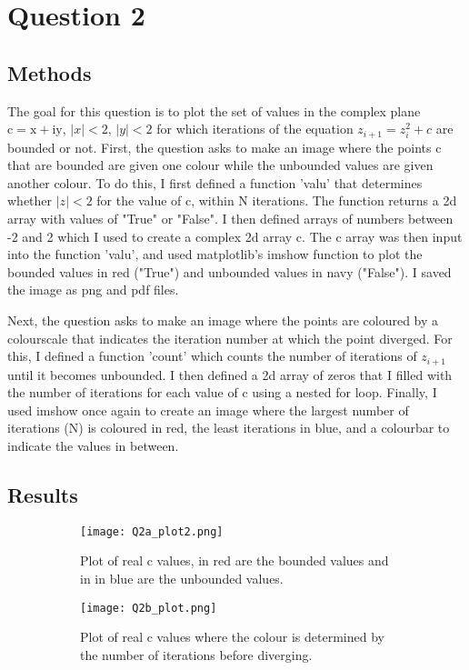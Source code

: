 \documentclass{article}
\begin{document}
\section*{Question 2}
\subsection*{Methods}
The goal for this question is to plot the set of values in the complex plane $\mathrm{c=x+iy},\, |x|<2, \, |y|<2$ for which iterations of the equation $z_{i+1}=z_i^2+c$ are bounded or not. First, the question asks to make an image where the points c that are bounded are given one colour while the unbounded values are given another colour. To do this, I first defined a function 'valu' that determines whether $|z|<2$ for the value of c, within N iterations. The function returns a 2d array with values of "True" or "False". I then defined arrays of numbers between -2 and 2 which I used to create a complex 2d array c. The c array was then input into the function 'valu', and used matplotlib's imshow function to plot the bounded values in red ("True") and unbounded values in navy ("False"). I saved the image as png and pdf files. 

Next, the question asks to make an image where the points are coloured by a colourscale that indicates the iteration number at which the point diverged. For this, I defined a function 'count' which counts the number of iterations of $z_{i+1}$ until it becomes unbounded. I then defined a 2d array of zeros that I filled with the number of iterations for each value of c using a nested for loop. Finally, I used imshow once again to create an image where the largest number of iterations (N) is coloured in red, the least iterations in blue, and a colourbar to indicate the values in between.  

\subsection*{Results}
\begin{figure}[h]
\centering
\begin{subfigure}{0.5\textwidth}
  \texttt{[image: Q2a\_plot2.png]}
    \caption{Plot of real c values, in red are the bounded values and in in blue are the unbounded values.} \label{fig:1a}
\end{subfigure}
\begin{subfigure}{0.4\textwidth}
  \texttt{[image: Q2b\_plot.png]}
    \caption{Plot of real c values where the colour is determined by the number of iterations before diverging.} \label{fig:1a}
\end{subfigure}
\captionsetup{justification=centering}
\caption{  \label{fig:dmxz}}

\end{figure}
\end{document}

